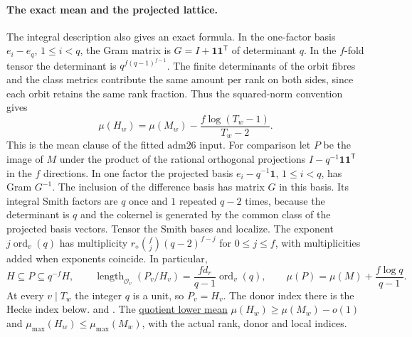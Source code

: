 \paragraph{The exact mean and the projected lattice.}
\leavevmode{}%
The integral description also gives an exact formula. In the
one-factor basis \(e_i-e_q\), \(1\le i<q\), the Gram matrix is
\(G=I+\mathbf1\mathbf1^{\mathsf T}\) of determinant \(q\).
In the \(f\)-fold tensor the determinant is
\(q^{f(q-1)^{f-1}}\). The finite determinants of the orbit
fibres and the class metrics contribute the same amount per
rank on both sides, since each orbit retains the same rank
fraction. Thus the squared-norm convention gives
\begin{equation}
\label{eq:exact-ramified-column-slope}
 \mu(H_w)=\mu(M_w)-\frac{f\log(T_w-1)}{T_w-2}.
\end{equation}
This is the mean clause of the fitted \(\mathrm{adm26}\) input.
For comparison let \(P\) be the image of \(M\) under the product
of the rational orthogonal projections
\(I-q^{-1}\mathbf1\mathbf1^{\mathsf T}\) in the \(f\) directions.
In one factor the projected basis \(e_i-q^{-1}\mathbf1\),
\(1\le i<q\), has Gram \(G^{-1}\). The inclusion of the
difference basis has matrix \(G\) in this basis. Its integral
Smith factors are \(q\) once and \(1\) repeated \(q-2\) times,
because the determinant is \(q\) and the cokernel is generated
by the common class of the projected basis vectors. Tensor
the Smith bases and localize. The exponent \(j\operatorname{ord}_v(q)\)
has multiplicity \(r_\diamond\binom fj(q-2)^{f-j}\) for
\(0\le j\le f\), with multiplicities added when exponents
coincide. In particular,
\[
 H\subseteq P\subseteq q^{-f}H,\qquad
 \operatorname{length}_{\mathcal O_v}(P_v/H_v)
      =\frac{f d_r}{q-1}\operatorname{ord}_v(q),\qquad
 \mu(P)=\mu(M)+\frac{f\log q}{q-1}.
\]
At every \(v\mid T_w\) the integer \(q\) is a unit, so
\(P_v=H_v\). The donor index there is the Hecke index below.
 and
.
{The \hyperlink{proof.ramified-kernel-lower-mean}{quotient lower mean}
\(\mu(H_w)\ge\mu(M_w)-o(1)\) and
\(\mu_{\max}(H_w)\le\mu_{\max}(M_w)\), with the actual rank,
donor and local indices.}

